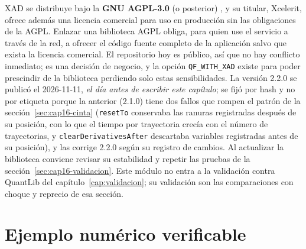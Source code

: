 \begin{sloppypar}
XAD se distribuye bajo la \textbf{GNU AGPL-3.0} (o posterior) \citep{xad2026}, y su titular, Xcelerit, ofrece además una licencia
comercial para uso en producción sin las obligaciones de la AGPL. Enlazar una biblioteca AGPL obliga, para quien use el
servicio a través de la red, a ofrecer el código fuente completo de la aplicación salvo que exista la licencia
comercial. El repositorio hoy es público, así que no hay conflicto inmediato; es una decisión de negocio, y la opción
\texttt{QF\_WITH\_XAD} existe para poder prescindir de la biblioteca perdiendo solo estas sensibilidades. La versión
2.2.0 se publicó el 2026-11-11, \emph{el día antes de escribir este capítulo}; se fijó por hash y no por etiqueta porque
la anterior (2.1.0) tiene dos fallos que rompen el patrón de la sección~\ref{sec:cap16-cinta} (\texttt{resetTo}
conservaba las ranuras registradas después de su posición, con lo que el tiempo por trayectoria crecía con el número
de trayectorias, y \texttt{clearDerivativesAfter} descartaba variables registradas antes de su posición), y las corrige 2.2.0 según su
registro de cambios. Al actualizar la biblioteca conviene revisar su estabilidad y repetir las pruebas de la
sección~\ref{sec:cap16-validacion}. Este módulo no entra a la validación contra QuantLib del
capítulo~\ref{cap:validacion}; su validación son las comparaciones con choque y reprecio de esa sección.
\end{sloppypar}

\section{Ejemplo numérico verificable}\label{sec:cap16-ejemplo}

